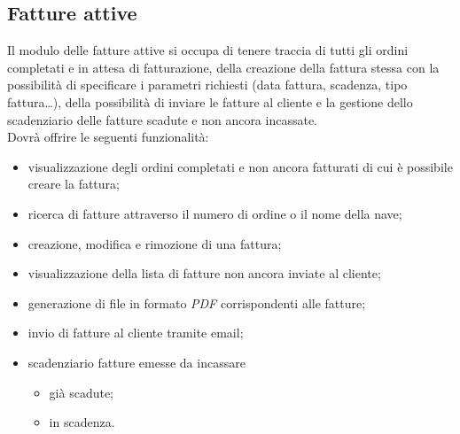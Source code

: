 	\subsection{Fatture attive}
	Il modulo delle fatture attive si occupa di tenere traccia di tutti gli ordini completati e in attesa
	di fatturazione, della creazione della fattura stessa con la possibilità di specificare i parametri
	richiesti (data fattura, scadenza, tipo fattura…), della possibilità di inviare le fatture al cliente e
	la gestione dello scadenziario delle fatture scadute e non ancora incassate.\\
	Dovrà offrire le seguenti funzionalità:
	\begin{itemize}
		\item visualizzazione degli ordini completati e non ancora fatturati di cui è possibile creare la fattura;
		\item ricerca di fatture attraverso il numero di ordine o il nome della nave;
		\item creazione, modifica e rimozione di una fattura;
		\item visualizzazione della lista di fatture non ancora inviate al cliente;
		\item generazione di file in formato \textit{PDF} corrispondenti alle fatture;
		\item invio di fatture al cliente tramite email;
		\item scadenziario fatture emesse da incassare
		\begin{itemize}
			\item già scadute;
			\item in scadenza.
		\end{itemize}
	\end{itemize}
	
